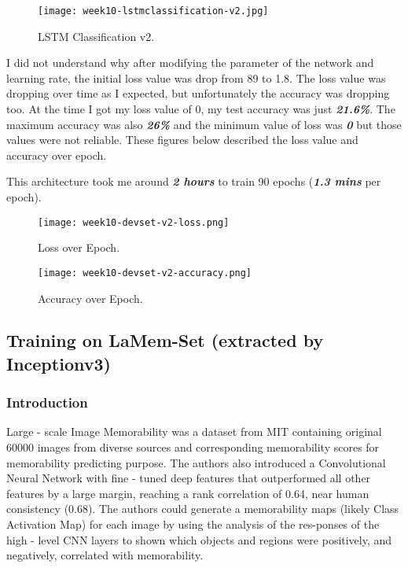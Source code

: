 \begin{figure}[!ht]
\centering
\texttt{[image: week10-lstmclassification-v2.jpg]}
\caption{LSTM Classification v2.}
\end{figure}

I did not understand why after modifying the parameter of the network and learning rate, the initial loss value was drop from 89 to 1.8. The loss value was dropping over time as I expected, but unfortunately the accuracy was dropping too. At the time I got my loss value of 0, my test accuracy was just \textbf{\emph{21.6\%}}. The maximum accuracy was also \textbf{\emph{26\%}} and the minimum value of loss was \textbf{\emph{0}} but those values were not reliable. These figures below described the loss value and accuracy over epoch.

This architecture took me around \textbf{\emph{2 hours}} to train 90 epochs (\textbf{\emph{1.3 mins}} per epoch).

\newpage
\begin{figure}[!ht]
\centering
\texttt{[image: week10-devset-v2-loss.png]}
\caption{Loss over Epoch.}
\end{figure}

\begin{figure}[!ht]
\centering
\texttt{[image: week10-devset-v2-accuracy.png]}
\caption{Accuracy over Epoch.}
\end{figure}

\newpage
\subsection{Training on LaMem-Set (extracted by Inceptionv3)}
\subsubsection{Introduction}
Large - scale Image Memorability\cite{lamem} was a dataset from MIT containing original 60000 images from diverse sources and corresponding memorability scores for memorability predicting purpose. The authors also introduced a Convolutional Neural Network with fine - tuned deep features that outperformed all other features by a large margin, reaching a rank correlation of 0.64, near human consistency (0.68). The authors could generate a memorability maps (likely Class Activation Map) for each image by using the analysis of the res-ponses of the high - level CNN layers to shown which objects and regions were positively, and negatively, correlated with memorability.

